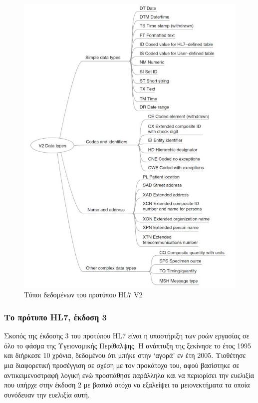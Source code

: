 	\begin{figure}[H]
	    \centering
	    \includegraphics[width=1\textwidth]{HL7_V2_data_types.jpg}
	    \caption{Τύποι δεδομένων του προτύπου HL7 V2}
	    \label{fig:HL7_V2_data_types}
	\end{figure}
			
		\subsubsection{Το πρότυπο HL7, έκδοση 3}
		Σκοπός της έκδοσης 3 του προτύπου HL7 είναι η υποστήριξη των ροών εργασίας σε όλο το φάσμα της Υγειονομικής Περίθαλψης. Η ανάπτυξη της ξεκίνησε το έτος 1995 και διήρκεσε 10 χρόνια, δεδομένου ότι μπήκε στην `αγορά' εν έτη 2005. Υιοθέτησε μια διαφορετική προσέγγιση σε σχέση με τον προκάτοχο του, αφού βασίστηκε σε αντικειμενοστραφή λογική ενώ προσπάθησε παράλληλα και να περιορίσει την ευελιξία που υπήρχε στην έκδοση 2 με βασικό στόχο να εξαλείψει τα μειονεκτήματα τα οποία συνόδευαν την ευελιξία αυτή\cite{HL7V3ProductSuite}.
		
